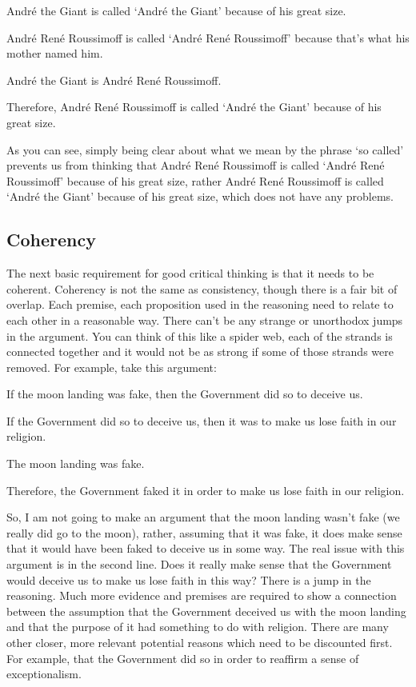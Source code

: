 \begin{earg}
    \item[]André the Giant is called `André the Giant' because of his great size.
    \item[]André René Roussimoff is called `André René Roussimoff' because that's what his mother named him.
    \item[]André the Giant is André René Roussimoff.
    \item[]Therefore, André René Roussimoff is called `André the Giant' because of his great size.
\end{earg}

As you can see, simply being clear about what we mean by the phrase `so called' prevents us from thinking that André René Roussimoff is called `André René Roussimoff' because of his great size, rather André René Roussimoff is called `André the Giant' because of his great size, which does not have any problems. 
\subsection{Coherency}

The next basic requirement for good critical thinking is that it needs to be coherent. Coherency is not the same as consistency, though there is a fair bit of overlap. Each premise, each proposition used in the reasoning need to relate to each other in a reasonable way. There can't be any strange or unorthodox jumps in the argument. You can think of this like a spider web, each of the strands is connected together and it would not be as strong if some of those strands were removed. For example, take this argument:
\begin{earg}
    \item[]If the moon landing was fake, then the Government did so to deceive us.
    \item[]If the Government did so to deceive us, then it was to make us lose faith in our religion.
    \item[]The moon landing was fake.
    \item[]Therefore, the Government faked it in order to make us lose faith in our religion.
\end{earg}
So, I am not going to make an argument that the moon landing wasn't fake (we really did go to the moon), rather, assuming that it was fake, it does make sense that it would have been faked to deceive us in some way. The real issue with this argument is in the second line. Does it really make sense that the Government would deceive us to make us lose faith in this way? There is a jump in the reasoning. Much more evidence and premises are required to show a connection between the assumption that the Government deceived us with the moon landing and that the purpose of it had something to do with religion. There are many other closer, more relevant potential reasons which need to be discounted first. For example, that the Government did so in order to reaffirm a sense of exceptionalism.

